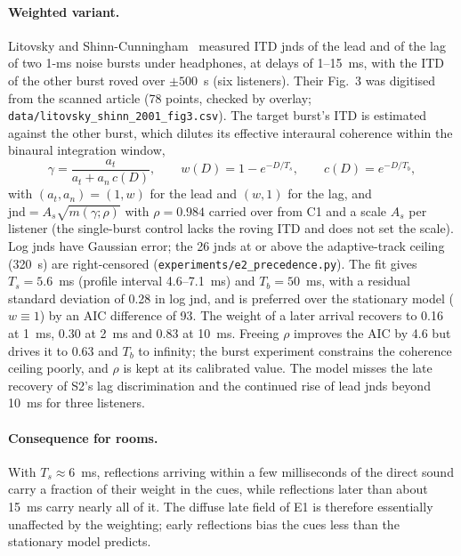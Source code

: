 \documentclass[10pt]{article}
\theoremstyle{definition}
\begin{document}
\paragraph{Weighted variant.} Litovsky and Shinn-Cunningham~\cite{litovsky2001} measured ITD jnds of the lead and of the lag of two 1-ms noise bursts under headphones, at delays of 1--15~ms, with the ITD of the other burst roved over $\pm500$~\textmu s (six listeners). Their Fig.~3 was digitised from the scanned article (78 points, checked by overlay; \texttt{data/litovsky\_shinn\_2001\_fig3.csv}). The target burst's ITD is estimated against the other burst, which dilutes its effective interaural coherence within the binaural integration window,
\begin{equation}
\gamma=\frac{a_t}{a_t+a_n\,c(D)},\qquad
w(D)=1-e^{-D/T_s},\qquad c(D)=e^{-D/T_b},
\end{equation}
with $(a_t,a_n)=(1,w)$ for the lead and $(w,1)$ for the lag, and $\mathrm{jnd}=A_s\sqrt{m(\gamma;\rho)}$ with $\rho=0.984$ carried over from C1 and a scale $A_s$ per listener (the single-burst control lacks the roving ITD and does not set the scale). Log jnds have Gaussian error; the 26 jnds at or above the adaptive-track ceiling (320~\textmu s) are right-censored (\texttt{experiments/e2\_precedence.py}). The fit gives $T_s=5.6$~ms (profile interval 4.6--7.1~ms) and $T_b=50$~ms, with a residual standard deviation of 0.28 in log jnd, and is preferred over the stationary model ($w\equiv1$) by an AIC difference of 93. The weight of a later arrival recovers to 0.16 at 1~ms, 0.30 at 2~ms and 0.83 at 10~ms. Freeing $\rho$ improves the AIC by 4.6 but drives it to 0.63 and $T_b$ to infinity; the burst experiment constrains the coherence ceiling poorly, and $\rho$ is kept at its calibrated value. The model misses the late recovery of S2's lag discrimination and the continued rise of lead jnds beyond 10~ms for three listeners.

\paragraph{Consequence for rooms.} With $T_s\approx6$~ms, reflections arriving within a few milliseconds of the direct sound carry a fraction of their weight in the cues, while reflections later than about 15~ms carry nearly all of it. The diffuse late field of E1 is therefore essentially unaffected by the weighting; early reflections bias the cues less than the stationary model predicts.
\end{document}

